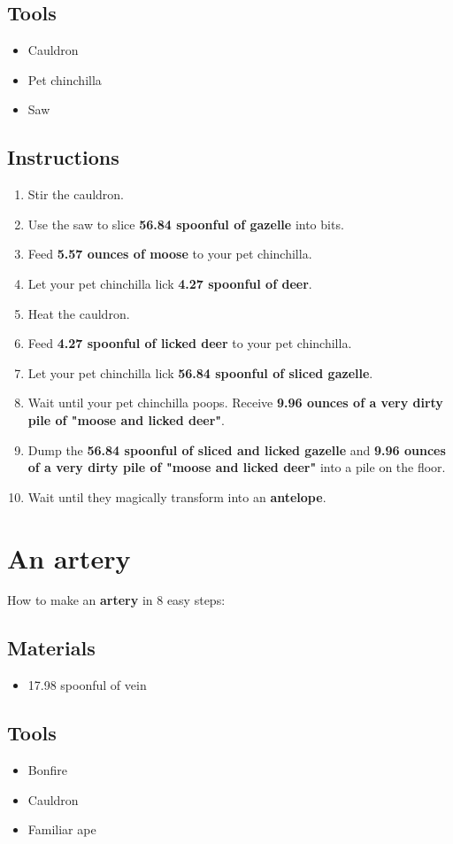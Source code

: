 \documentclass{article}
\begin{document}
\subsection{Tools}\begin{itemize}
\item 
Cauldron
\item 
Pet chinchilla
\item 
Saw
\end{itemize}
\subsection{Instructions}\begin{enumerate}
\item 
Stir the cauldron.
\item 
Use the saw to slice \textbf{56.84 spoonful of gazelle} into bits.
\item 
Feed \textbf{5.57 ounces of moose} to your pet chinchilla.
\item 
Let your pet chinchilla lick \textbf{4.27 spoonful of deer}.
\item 
Heat the cauldron.
\item 
Feed \textbf{4.27 spoonful of licked deer} to your pet chinchilla.
\item 
Let your pet chinchilla lick \textbf{56.84 spoonful of sliced gazelle}.
\item 
Wait until your pet chinchilla poops. Receive \textbf{9.96 ounces of a very dirty pile of "moose and licked deer"}.
\item 
Dump the \textbf{56.84 spoonful of sliced and licked gazelle} and \textbf{9.96 ounces of a very dirty pile of "moose and licked deer"} into a pile on the floor.
\item 
Wait until they magically transform into an \textbf{antelope}.
\end{enumerate}
\newpage
\section{An artery}How to make an \textbf{artery} in 8 easy steps:

\subsection{Materials}\begin{itemize}
\item 
17.98 spoonful of vein
\end{itemize}
\subsection{Tools}\begin{itemize}
\item 
Bonfire
\item 
Cauldron
\item 
Familiar ape
\end{itemize}
\end{document}
